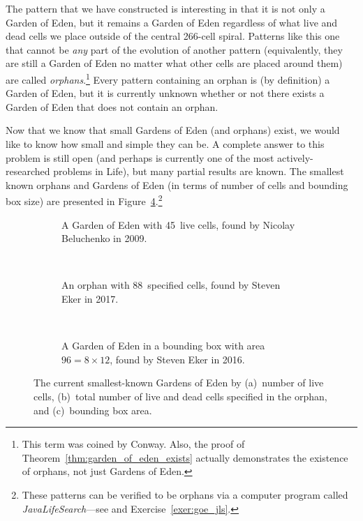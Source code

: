 The pattern that we have constructed is interesting in that it is not only a Garden of Eden, but it remains a Garden of Eden regardless of what live and dead cells we place outside of the central 266-cell spiral. Patterns like this one that cannot be \emph{any} part of the evolution of another pattern (equivalently, they are still a Garden of Eden no matter what other cells are placed around them) are called \emph{orphans}.\footnote{This term was coined by Conway. Also, the proof of Theorem~\ref{thm:garden_of_eden_exists} actually demonstrates the existence of orphans, not just Gardens of Eden.} Every pattern containing an orphan is (by definition) a Garden of Eden, but it is currently unknown whether or not there exists a Garden of Eden that does not contain an orphan.
	
Now that we know that small Gardens of Eden (and orphans) exist, we would like to know how small and simple they can be. A complete answer to this problem is still open (and perhaps is currently one of the most actively-researched problems in Life), but many partial results are known. The smallest known orphans and Gardens of Eden (in terms of number of cells and bounding box size) are presented in Figure~\ref{fig:goe_records}.\footnote{These patterns can be verified to be orphans via a computer program called \emph{JavaLifeSearch}---see  and Exercise~\ref{exer:goe_jls}.}

\begin{figure}[!htb]
	\centering
	\begin{subfigure}{.31\textwidth}
		\centering
		\caption{A Garden of Eden with 45~live cells, found by Nicolay Beluchenko in 2009.}
		\label{fig:goe_record_alive}
	\end{subfigure} \ \ \ \ %
	\begin{subfigure}{.31\textwidth}
		\centering
		\caption{An orphan with 88~specified cells, found by Steven Eker in 2017.} %
		\label{fig:goe_record_orphan}
	\end{subfigure} \ \ \ \ %
	\begin{subfigure}{.31\textwidth}
		\centering
		\caption{A Garden of Eden in a bounding box with area $96 = 8 \times 12$, found by Steven Eker in 2016.}
		\label{fig:goe_record_bb}
	\end{subfigure}
	\caption{The current smallest-known Gardens of Eden by (a)~number of live cells, (b)~total number of live and dead cells specified in the orphan, and (c)~bounding box area.}\label{fig:goe_records}
\end{figure}

